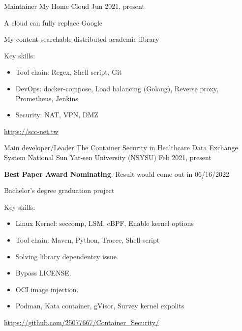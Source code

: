\begin{cventries}
    \cventry
    {Maintainer}
    {My Home Cloud}
    {} %
    {Jun 2021, present} %
    {
        \begin{cvitems} %
            \item {A cloud can fully replace Google}
            \item {My content searchable distributed academic library}
            \item {Key skills:}
            \begin{itemize}
                \item Tool chain: Regex, Shell script, Git
                \item DevOps: docker-compose, Load balancing (Golang), Reverse proxy, Prometheus, Jenkins
                \item Security: NAT, VPN, DMZ
            \end{itemize}
            \item {\url{https://scc-net.tw}}
        \end{cvitems}
    }

    \cventry
    {Main developer/Leader}
    {The Container Security in Healthcare Data Exchange System}
    {National Sun Yat-sen University (NSYSU)} %
    {Feb 2021, present} %
    {
        \begin{cvitems} %
            \item {\textbf{Best Paper Award Nominating}: Result would come out in 06/16/2022}
            \item {Bachelor's degree graduation project}
            \item {Key skills:}
            \begin{itemize}
                \item Linux Kernel: seccomp, LSM, eBPF, Enable kernel options
                \item Tool chain: Maven, Python, Tracee, Shell script
                \item Solving library dependentcy issue.
                \item Bypass LICENSE.
                \item OCI image injection.
                \item Podman, Kata container, gVisor, Survey kernel expolits
            \end{itemize}
            \item {\url{https://github.com/25077667/Container_Security/}}
        \end{cvitems}
    }


\end{cventries}
